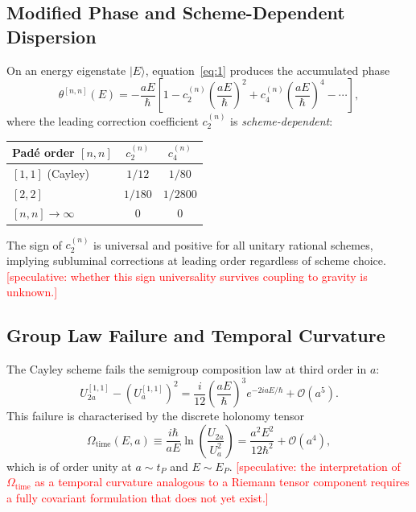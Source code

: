\documentclass[11pt,a4paper]{article}
\begin{document}
\subsection{Modified Phase and Scheme-Dependent Dispersion}

On an energy eigenstate $|E\rangle$, equation~\eqref{eq:1} produces the accumulated phase
\begin{equation}
  \theta^{[n,n]}(E) = -\frac{aE}{\hbar}\left[1 - c_2^{(n)}\!\left(\frac{aE}{\hbar}\right)^{\!2} + c_4^{(n)}\!\left(\frac{aE}{\hbar}\right)^{\!4} - \cdots\right],
  \label{eq:3}
\end{equation}
where the leading correction coefficient $c_2^{(n)}$ is \emph{scheme-dependent}:
\begin{center}
\begin{tabular}{lcc}
\hline
Pad\'{e} order $[n,n]$ & $c_2^{(n)}$ & $c_4^{(n)}$ \\
\hline
$[1,1]$ (Cayley) & $1/12$ & $1/80$ \\
$[2,2]$ & $1/180$ & $1/2800$ \\
$[n,n]\to\infty$ & $0$ & $0$ \\
\hline
\end{tabular}
\end{center}
The sign of $c_2^{(n)}$ is universal and positive for all unitary rational schemes, implying subluminal corrections at leading order regardless of scheme choice. \textcolor{red}{[speculative: whether this sign universality survives coupling to gravity is unknown.]}

\subsection{Group Law Failure and Temporal Curvature}

The Cayley scheme fails the semigroup composition law at third order in $a$:
\begin{equation}
  U_{2a}^{[1,1]} - \left(U_a^{[1,1]}\right)^2 = \frac{i}{12}\!\left(\frac{aE}{\hbar}\right)^{\!3} e^{-2iaE/\hbar} + \mathcal{O}(a^5).
  \label{eq:4}
\end{equation}
This failure is characterised by the discrete holonomy tensor
\begin{equation}
  \Omega_{\mathrm{time}}(E,a) \equiv \frac{i\hbar}{aE}\ln\!\left(\frac{U_{2a}}{U_a^2}\right) = \frac{a^2E^2}{12\hbar^2} + \mathcal{O}(a^4),
  \label{eq:5}
\end{equation}
which is of order unity at $a \sim t_P$ and $E \sim E_P$. \textcolor{red}{[speculative: the interpretation of $\Omega_{\mathrm{time}}$ as a temporal curvature analogous to a Riemann tensor component requires a fully covariant formulation that does not yet exist.]}
\end{document}
